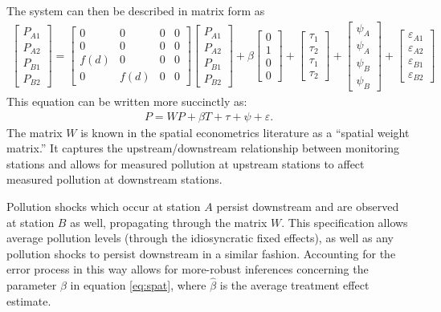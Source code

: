 \documentclass[12pt]{article}
\newcommand{\e}{\varepsilon}
\newcommand{\anum}[1]{\begin{align}#1\end{align}}
\begin{document}
The system can then be described in matrix form as
\anum{
	\left[ \begin{matrix} P_{A1} \\ P_{A2} \\ P_{B1} \\ P_{B2} \end{matrix} \right]
	= 
	\left[\begin{matrix} 
		0 & 0 & 0 & 0 \\
		0 & 0 & 0 & 0 \\
		f(d) & 0 & 0 & 0 \\
		0 & f(d) & 0 & 0 		
	\end{matrix}\right]
	\left[ \begin{matrix} P_{A1} \\ P_{A2} \\ P_{B1} \\ P_{B2} \end{matrix} \right]
	+ \beta \left[ \begin{matrix} 0 \\ 1 \\ 0 \\ 0 \end{matrix} \right]
	+ \left[ \begin{matrix} \tau_1 \\ \tau_2 \\ \tau_1 \\ \tau_2 \end{matrix} \right]
	+ \left[ \begin{matrix} \psi_A \\ \psi_A \\ \psi_B \\ \psi_B \end{matrix} \right]
	+ \left[ \begin{matrix} \e_{A1} \\ \e_{A2} \\ \e_{B1} \\ \e_{B2} \end{matrix} \right] 
}
This equation can be written more succinctly as:
\anum{
	P = WP + \beta T + \tau + \psi + \e. \label{eq:spat}
}
The matrix $W$ is known in the spatial econometrics literature as a ``spatial weight matrix.'' It captures the upstream/downstream relationship between monitoring stations and allows for measured pollution at upstream stations to affect measured pollution at downstream stations. 

Pollution shocks which occur at station $A$ persist downstream and are observed at station $B$ as well, propagating through the matrix $W$. This specification allows average pollution levels (through the idiosyncratic fixed effects), as well as any pollution shocks to persist downstream in a similar fashion. Accounting for the error process in this way allows for more-robust inferences concerning the parameter $\beta$ in equation \ref{eq:spat}, where $\hat{\beta}$ is the average treatment effect estimate.
\end{document}
